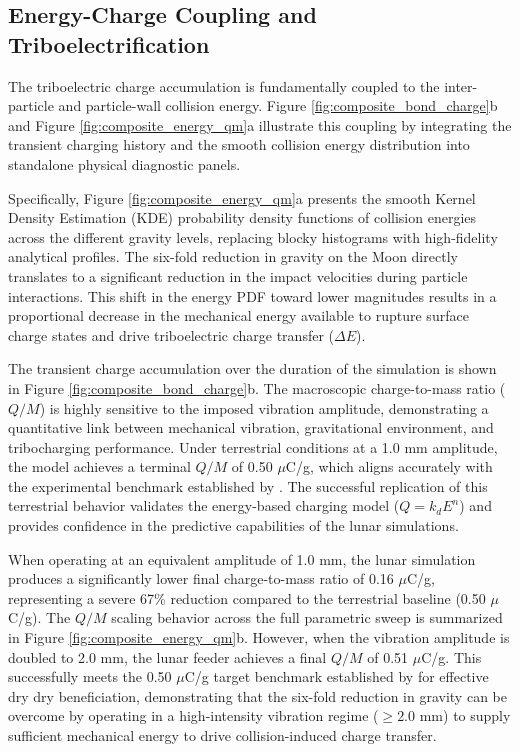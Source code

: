 \documentclass[preprint,12pt,authoryear]{elsarticle}
\begin{document}
\subsection{Energy-Charge Coupling and Triboelectrification}
\label{sec:results_charging}
The triboelectric charge accumulation is fundamentally coupled to the inter-particle and particle-wall collision energy. Figure \ref{fig:composite_bond_charge}b and Figure \ref{fig:composite_energy_qm}a illustrate this coupling by integrating the transient charging history and the smooth collision energy distribution into standalone physical diagnostic panels.

Specifically, Figure \ref{fig:composite_energy_qm}a presents the smooth Kernel Density Estimation (KDE) probability density functions of collision energies across the different gravity levels, replacing blocky histograms with high-fidelity analytical profiles. The six-fold reduction in gravity on the Moon directly translates to a significant reduction in the impact velocities during particle interactions. This shift in the energy PDF toward lower magnitudes results in a proportional decrease in the mechanical energy available to rupture surface charge states and drive triboelectric charge transfer ($\Delta E$).

The transient charge accumulation over the duration of the simulation is shown in Figure \ref{fig:composite_bond_charge}b. The macroscopic charge-to-mass ratio ($Q/M$) is highly sensitive to the imposed vibration amplitude, demonstrating a quantitative link between mechanical vibration, gravitational environment, and tribocharging performance. Under terrestrial conditions at a 1.0 mm amplitude, the model achieves a terminal $Q/M$ of 0.50 $\mu$C/g, which aligns accurately with the experimental benchmark established by \cite{Trigwell2009}. The successful replication of this terrestrial behavior validates the energy-based charging model ($Q = k_d E^n$) and provides confidence in the predictive capabilities of the lunar simulations.

When operating at an equivalent amplitude of 1.0 mm, the lunar simulation produces a significantly lower final charge-to-mass ratio of 0.16 $\mu$C/g, representing a severe 67\% reduction compared to the terrestrial baseline (0.50 $\mu$C/g). The $Q/M$ scaling behavior across the full parametric sweep is summarized in Figure \ref{fig:composite_energy_qm}b. However, when the vibration amplitude is doubled to 2.0 mm, the lunar feeder achieves a final $Q/M$ of 0.51 $\mu$C/g. This successfully meets the 0.50 $\mu$C/g target benchmark established by \cite{Trigwell2009} for effective dry dry beneficiation, demonstrating that the six-fold reduction in gravity can be overcome by operating in a high-intensity vibration regime ($\ge 2.0$ mm) to supply sufficient mechanical energy to drive collision-induced charge transfer.
\end{document}
